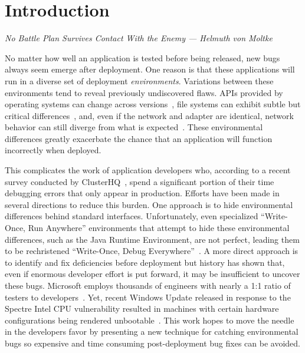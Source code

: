 \section{Introduction}
\label{SEC:introduction}
\textit{No Battle Plan Survives Contact With the Enemy --- Helmuth von Moltke}

No matter how well an application is tested before being released,
new bugs always seem emerge after deployment.
One reason is that these applications will run in a diverse set of
deployment \emph{environments}.
Variations between these environments tend to
reveal previously undiscovered flaws.
APIs provided by operating systems can change across versions~\cite{LinuxGlibcChanges},
file systems can exhibit subtle but critical differences~\cite{EXT4Layout, AppleHFS},
and, even if the network and adapter are identical,
network behavior can still diverge from what is expected~\cite{vbox}.
These environmental differences greatly exacerbate
the chance that an application will function incorrectly when deployed.

This complicates the work of application developers who, according to a
recent survey conducted by ClusterHQ~\cite{ClusterHQSurvey},
spend a significant portion of their time
debugging errors that only appear in production.
Efforts have been made in several directions to reduce this burden.  One
approach is to hide environmental differences behind standard interfaces.
Unfortunately,
even specialized ``Write-Once, Run Anywhere'' environments
that attempt to hide these environmental differences,
such as the Java Runtime Environment,
are not perfect,
leading them to be rechristened ``Write-Once, Debug Everywhere''~\cite{WODE}.
A more direct approach is
to identify and fix deficiencies before deployment
but history has shown that,
even if enormous developer effort is put forward,
it may be insufficient to uncover these bugs.
Microsoft employs thousands of engineers with nearly a
1:1 ratio of testers to developers~\cite{Page2009}.
Yet, recent Windows Update released
in response to the Spectre Intel CPU vulnerability
resulted in machines with certain hardware configurations
being rendered unbootable~\cite{kb4056892}.
This work hopes to move the needle in the developers favor by presenting a
new technique for catching environmental bugs
so expensive and time consuming post-deployment bug fixes
can be avoided.


